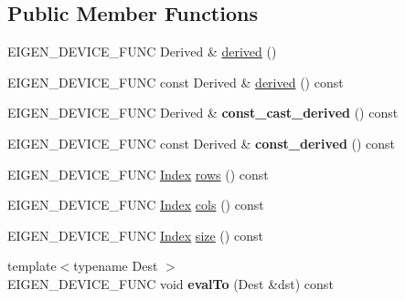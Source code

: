 \subsection*{Public Member Functions}
\begin{DoxyCompactItemize}
\item 
E\+I\+G\+E\+N\+\_\+\+D\+E\+V\+I\+C\+E\+\_\+\+F\+U\+NC Derived \& \mbox{\hyperlink{struct_eigen_1_1_eigen_base_a324b16961a11d2ecfd2d1b7dd7946545}{derived}} ()
\item 
E\+I\+G\+E\+N\+\_\+\+D\+E\+V\+I\+C\+E\+\_\+\+F\+U\+NC const Derived \& \mbox{\hyperlink{struct_eigen_1_1_eigen_base_ad0cbee5e2dfef3bbe9db5e6d5fe12cc0}{derived}} () const
\item 
\mbox{\label{struct_eigen_1_1_eigen_base_a5e53ffacb6f476ca0d9f151808e68d2a}} 
E\+I\+G\+E\+N\+\_\+\+D\+E\+V\+I\+C\+E\+\_\+\+F\+U\+NC Derived \& {\bfseries const\+\_\+cast\+\_\+derived} () const
\item 
\mbox{\label{struct_eigen_1_1_eigen_base_a00ddfc99f2e8fe2f5369eff4a168e370}} 
E\+I\+G\+E\+N\+\_\+\+D\+E\+V\+I\+C\+E\+\_\+\+F\+U\+NC const Derived \& {\bfseries const\+\_\+derived} () const
\item 
E\+I\+G\+E\+N\+\_\+\+D\+E\+V\+I\+C\+E\+\_\+\+F\+U\+NC \mbox{\hyperlink{struct_eigen_1_1_eigen_base_a554f30542cc2316add4b1ea0a492ff02}{Index}} \mbox{\hyperlink{struct_eigen_1_1_eigen_base_a8141320ba8df384426c298b32b000d8e}{rows}} () const
\item 
E\+I\+G\+E\+N\+\_\+\+D\+E\+V\+I\+C\+E\+\_\+\+F\+U\+NC \mbox{\hyperlink{struct_eigen_1_1_eigen_base_a554f30542cc2316add4b1ea0a492ff02}{Index}} \mbox{\hyperlink{struct_eigen_1_1_eigen_base_a7b0b45c7351847696c911ce8aa2abbdb}{cols}} () const
\item 
E\+I\+G\+E\+N\+\_\+\+D\+E\+V\+I\+C\+E\+\_\+\+F\+U\+NC \mbox{\hyperlink{struct_eigen_1_1_eigen_base_a554f30542cc2316add4b1ea0a492ff02}{Index}} \mbox{\hyperlink{struct_eigen_1_1_eigen_base_ac2c9348df3bb9c0044dbae6c278a8977}{size}} () const
\item 
\mbox{\label{struct_eigen_1_1_eigen_base_a991b21b79bb613171a53271933c53cab}} 
{\footnotesize template$<$typename Dest $>$ }\\E\+I\+G\+E\+N\+\_\+\+D\+E\+V\+I\+C\+E\+\_\+\+F\+U\+NC void {\bfseries eval\+To} (Dest \&dst) const
\item 

\end{DoxyCompactItemize}
